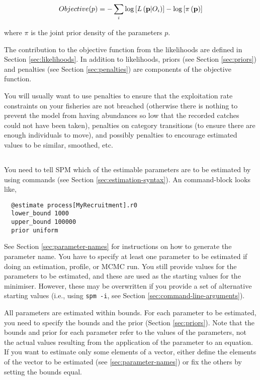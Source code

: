 \begin{equation}
Objective(p)= - \sum\limits_i {\log \left[ {L\left( {{\bf{p}}|O_i } \right)} \right]}  - \log \left[ {\pi \left( {\bf{p}} \right)} \right]
\end{equation}

where $\pi$ is the joint prior density of the parameters $p$.

The contribution to the objective function from the likelihoods are defined in Section \ref{sec:likelihoods}. In addition to likelihoods, priors (see Section \ref{sec:priors}) and penalties (see Section \ref{sec:penalties}) are components of the objective function. 

You will usually want to use penalties to ensure that the exploitation rate constraints on your fisheries are not breached (otherwise there is nothing to prevent the model from having abundances so low that the recorded catches could not have been taken), penalties on category transitions (to ensure there are enough individuals to move), and possibly penalties to encourage estimated values to be similar, smoothed, etc.

\subsection{\label{sec:estimate-free-parameters}}

You need to tell SPM which of the estimable parameters are to be estimated by using  commands (see Section \ref{sec:estimation-syntax}). An  command-block looks like,

{\small{\begin{verbatim}
  @estimate process[MyRecruitment].r0
  lower_bound 1000
  upper_bound 100000
  prior uniform
\end{verbatim}}}

See Section \ref{sec:parameter-names} for instructions on how to generate the parameter name. You have to specify at least one parameter to be estimated if doing an estimation, profile, or MCMC run. You still provide values for the parameters to be estimated, and these are used as the starting values for the minimiser. However, these may be overwritten if you provide a set of alternative starting values (i.e., using  \texttt{spm -i}, see Section \ref{sec:command-line-arguments}).

All parameters are estimated within bounds. For each parameter to be estimated, you need to specify the bounds and the prior (Section \ref{sec:priors}). Note that the bounds and prior for each parameter refer to the values of the parameters, not the actual values resulting from the application of the parameter to an equation. If you want to estimate only some elements of a vector, either define the elements of the vector to be estimated (see \ref{sec:parameter-names}) or fix the others by setting the bounds equal.

